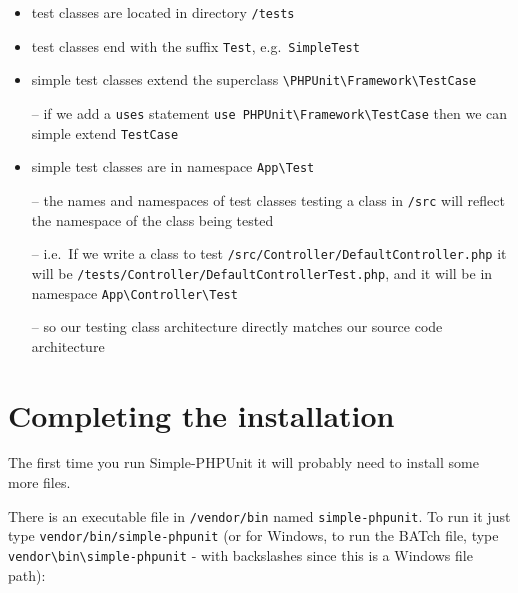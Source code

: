 \documentclass[a4paperpaper,openright]{book}
\begin{document}
\begin{itemize}
\item
  test classes are located in directory \texttt{/tests}
\item
  test classes end with the suffix \texttt{Test},
  e.g.~\texttt{SimpleTest}
\item
  simple test classes extend the superclass
  \texttt{\textbackslash{}PHPUnit\textbackslash{}Framework\textbackslash{}TestCase}

  -- if we add a \texttt{uses} statement
  \texttt{use\ PHPUnit\textbackslash{}Framework\textbackslash{}TestCase}
  then we can simple extend \texttt{TestCase}
\item
  simple test classes are in namespace \texttt{App\textbackslash{}Test}

  -- the names and namespaces of test classes testing a class in
  \texttt{/src} will reflect the namespace of the class being tested

  -- i.e.~If we write a class to test
  \texttt{/src/Controller/DefaultController.php} it will be
  \texttt{/tests/Controller/DefaultControllerTest.php}, and it will be
  in namespace
  \texttt{App\textbackslash{}Controller\textbackslash{}Test}

  -- so our testing class architecture directly matches our source code
  architecture
\end{itemize}

\hypertarget{completing-the-installation}{%
\section{Completing the
installation}\label{completing-the-installation}}

The first time you run Simple-PHPUnit it will probably need to install
some more files.

There is an executable file in \texttt{/vendor/bin} named
\texttt{simple-phpunit}. To run it just type
\texttt{vendor/bin/simple-phpunit} (or for Windows, to run the BATch
file, type
\texttt{vendor\textbackslash{}bin\textbackslash{}simple-phpunit} - with
backslashes since this is a Windows file path):
\end{document}
